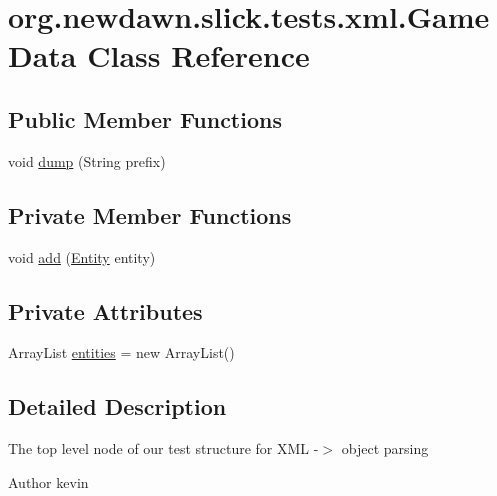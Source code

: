 \hypertarget{classorg_1_1newdawn_1_1slick_1_1tests_1_1xml_1_1_game_data}{}\section{org.\+newdawn.\+slick.\+tests.\+xml.\+Game\+Data Class Reference}
\label{classorg_1_1newdawn_1_1slick_1_1tests_1_1xml_1_1_game_data}
\subsection*{Public Member Functions}
\begin{DoxyCompactItemize}
\item 
void \mbox{\hyperlink{classorg_1_1newdawn_1_1slick_1_1tests_1_1xml_1_1_game_data_aa29ab866fa466f3558b2130fa4f11c3b}{dump}} (String prefix)
\end{DoxyCompactItemize}
\subsection*{Private Member Functions}
\begin{DoxyCompactItemize}
\item 
void \mbox{\hyperlink{classorg_1_1newdawn_1_1slick_1_1tests_1_1xml_1_1_game_data_a1e590ea2060ee02da4ad3795252c9fdb}{add}} (\mbox{\hyperlink{classorg_1_1newdawn_1_1slick_1_1tests_1_1xml_1_1_entity}{Entity}} entity)
\end{DoxyCompactItemize}
\subsection*{Private Attributes}
\begin{DoxyCompactItemize}
\item 
Array\+List \mbox{\hyperlink{classorg_1_1newdawn_1_1slick_1_1tests_1_1xml_1_1_game_data_a4dd5056d57a4ebbc53014d0650d1247f}{entities}} = new Array\+List()
\end{DoxyCompactItemize}


\subsection{Detailed Description}
The top level node of our test structure for X\+ML -\/$>$ object parsing

\begin{DoxyAuthor}{Author}
kevin 
\end{DoxyAuthor}


